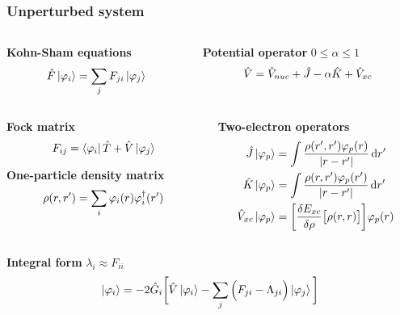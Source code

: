 \begin{frame}
    \frametitle{Unperturbed system}
    \begin{columns}
    \begin{column}[b]{0.5\linewidth}
    \centering
    \textbf{Kohn-Sham equations}
    \begin{equation}
        \nonumber
        \hat{F}\ket{\varphi_i} = \sum_j F_{ji}\ket{\varphi_j}
    \end{equation}
    \end{column}
    \begin{column}[b]{0.5\linewidth}
    \centering
    \textbf{Potential operator} $0 \leq \alpha \leq 1$
    \begin{equation}
        \nonumber
        \hat{V} = \hat{V}_{nuc} + \hat{J} - \alpha\hat{K} + \hat{V}_{xc}
    \end{equation}
    \end{column}
    \end{columns}

    \vspace{5mm}

    \begin{columns}
    \begin{column}[b]{0.5\linewidth}
    \centering
    \textbf{Fock matrix}
    \begin{equation}
        \nonumber
        F_{ij} = \bra{\varphi_i}\hat{T} + \hat{V}\ket{\varphi_j}
    \end{equation}

    \vspace{8mm}

    \textbf{One-particle density matrix}
    \begin{equation}
        \nonumber
        \rho(r,r') = \sum_i \varphi_i(r)\varphi_i^\dag(r')
    \end{equation}
    \end{column}
    \begin{column}[b]{0.5\linewidth}

    \centering
    \textbf{Two-electron operators}
    \begin{align}
        \nonumber
        \hat{J} \ket{\varphi_p} &= \int\frac{\rho(r',r')\varphi_p(r)}{|r-r'|} \,\mathrm{d} r'\\
        \nonumber
        \hat{K} \ket{\varphi_p} &= \int\frac{\rho(r,r')\varphi_p(r')}{|r-r'|} \,\mathrm{d} r'\\
        \nonumber
        \hat{V}_{xc} \ket{\varphi_p} &= \bigg[\frac{\delta E_{xc}}{\delta \rho}\big[\rho(r,r)\big]\bigg] \varphi_p(r) 
    \end{align}
    \end{column}
    \end{columns}

    \vspace{5mm}

    \centering
    \textbf{Integral form} $\lambda_{i} \approx F_{ii}$
    \begin{equation}
        \nonumber
        \ket{\varphi_i} = -2\hat{G}_i\bigg[\hat{V}\ket{\varphi_i} -
        \sum_j \Big(F_{ji} - \Lambda_{ji}\Big)\ket{\varphi_j}\bigg]
    \end{equation}
\end{frame}


